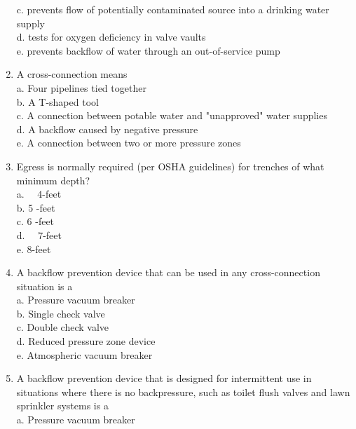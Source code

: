 \documentclass{article}
\begin{document}
\begin{enumerate}[1.]
c. prevents flow of potentially contaminated source into a drinking water supply\\

d. tests for oxygen deficiency in valve vaults\\

e. prevents backflow of water through an out-of-service pump\\

\item A cross-connection means\\
a. Four pipelines tied together\\
b. A T-shaped tool\\
c. A connection between potable water and "unapproved" water supplies\\
d. A backflow caused by negative pressure\\
e. A connection between two or more pressure zones \\

\item Egress is normally required (per OSHA guidelines) for trenches of what minimum depth?\\
a. $\quad 4$-feet\\
b. 5 -feet\\
c. 6 -feet\\
d. $\quad 7$-feet\\
e. 8-feet\\

\item A backflow prevention device that can be used in any cross-connection situation is a\\

a. Pressure vacuum breaker\\

b. Single check valve\\

c. Double check valve\\

d. Reduced pressure zone device\\

e. Atmospheric vacuum breaker\\

  \item A backflow prevention device that is designed for intermittent use in situations where there is no backpressure, such as toilet flush valves and lawn sprinkler systems is a\\
a. Pressure vacuum breaker\\


\end{enumerate}
\end{document}
